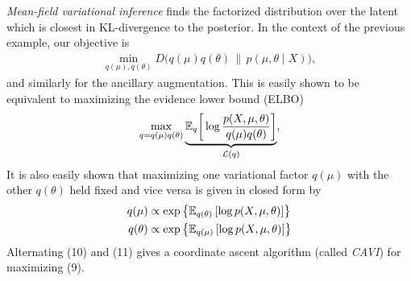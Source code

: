 \documentclass{article}
\begin{document}
{\sl Mean-field variational inference} finds the factorized distribution over the latent which is closest in KL-divergence to the posterior. In the context of the previous example, our objective is
\begin{align}
\min_{q(\mu),q(\theta)}D\bigg(q(\mu)q(\theta)\,\bigg\|\, p(\mu,\theta\mid X)\bigg),
\end{align}
and similarly for the ancillary augmentation. This is easily shown to be equivalent to maximizing the evidence lower bound (ELBO) 
\begin{align}
\max_{q = q(\mu)q(\theta)}\underbrace{\mathbb{E}_q\bigg[\log \frac{p(X,\mu,\theta)}{q(\mu)q(\theta)}\bigg]}_{\mathcal{L}(q)},
\end{align}
It is also easily shown that maximizing one variational factor $q(\mu)$ with the other $q(\theta)$ held fixed and vice versa is given in closed form by
\begin{align}
q(\mu)
&\propto \exp\left\{\mathbb{E}_{q(\theta)}\left[\log p(X,\mu,\theta)\right]\right\} \\
q(\theta)
&\propto \exp\left\{\mathbb{E}_{q(\mu)}\left[\log p(X,\mu,\theta)\right]\right\} 
\end{align}
Alternating (10) and (11) gives a coordinate ascent algorithm (called {\sl CAVI}) for maximizing (9). \newpage
\end{document}

